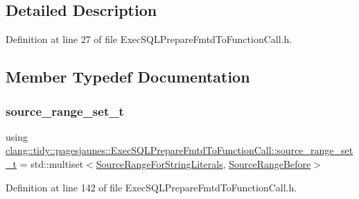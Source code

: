 \subsection{Detailed Description}


Definition at line 27 of file Exec\+S\+Q\+L\+Prepare\+Fmtd\+To\+Function\+Call.\+h.



\subsection{Member Typedef Documentation}
\mbox{\label{classclang_1_1tidy_1_1pagesjaunes_1_1_exec_s_q_l_prepare_fmtd_to_function_call_a3ab7783f33d270c69147df553202b920}} 
\subsubsection{\texorpdfstring{source\+\_\+range\+\_\+set\+\_\+t}{source\_range\_set\_t}}
{\footnotesize\ttfamily using \hyperlink{classclang_1_1tidy_1_1pagesjaunes_1_1_exec_s_q_l_prepare_fmtd_to_function_call_a3ab7783f33d270c69147df553202b920}{clang\+::tidy\+::pagesjaunes\+::\+Exec\+S\+Q\+L\+Prepare\+Fmtd\+To\+Function\+Call\+::source\+\_\+range\+\_\+set\+\_\+t} =  std\+::multiset$<$\hyperlink{classclang_1_1tidy_1_1pagesjaunes_1_1_exec_s_q_l_prepare_fmtd_to_function_call_1_1_source_range_for_string_literals}{Source\+Range\+For\+String\+Literals}, \hyperlink{classclang_1_1tidy_1_1pagesjaunes_1_1_exec_s_q_l_prepare_fmtd_to_function_call_1_1_source_range_before}{Source\+Range\+Before}$>$}



Definition at line 142 of file Exec\+S\+Q\+L\+Prepare\+Fmtd\+To\+Function\+Call.\+h.



